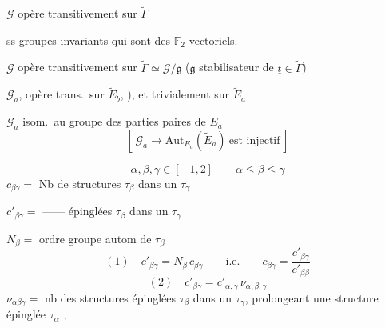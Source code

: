 \documentclass[11pt,a4paper]{article}
\begin{document}
$\mathcal{G}$ opère transitivement sur $\widetilde{\Gamma}$


ss-groupes invariants qui sont des $\mathbb{F}_2$-vectoriels.

$\mathcal{G}$ opère transitivement sur
$\widetilde{\Gamma}\simeq\mathcal{G}/\mathfrak{g}$ ($\mathfrak{g}$ stabilisateur de
$\underline{t}\in\widetilde{\Gamma}$)


$\mathcal{G}_a$,  opère trans.\ sur
$\widetilde{E}_b$, ), et trivialement sur
$\widetilde{E}_a$

$\mathcal{G}_a$ isom.\ au groupe des parties paires de $E_a$
\[
  [\,\mathcal{G}_a\to\mathrm{Aut}_{E_a}(\widetilde{E}_a)\ \text{est injectif}\,]
\]

\[
  \alpha,\beta,\gamma\in[-1,2]\qquad\alpha\leqslant\beta\leqslant\gamma
\]
$c_{\beta\gamma}=$ Nb de structures $\tau_\beta$ dans un $\tau_\gamma$

$c'_{\beta\gamma}=$ —— épinglées $\tau_\beta$ dans un $\tau_\gamma$

$N_\beta=$  ordre groupe autom de $\tau_\beta$
\[
  (1)\quad \boxed{c'_{\beta\gamma}=N_\beta\,c_{\beta\gamma}}\qquad\text{i.e.}\qquad
  \boxed{c_{\beta\gamma}=\frac{c'_{\beta\gamma}}{c'_{\beta\beta}}}
\]
\[
  (2)\quad \boxed{c'_{\beta\gamma}=c'_{\alpha,\gamma}\,\nu_{\alpha,\beta,\gamma}}
\]
$\nu_{\alpha\beta\gamma}=$ nb des structures épinglées $\tau_\beta$ dans un
$\tau_\gamma$, prolongeant une structure épinglée $\tau_\alpha$ ,
\end{document}
